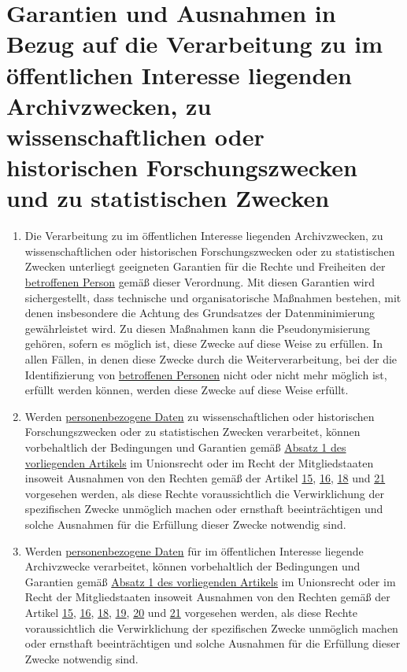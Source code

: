 \chapter{Garantien und Ausnahmen in Bezug auf die Verarbeitung zu im öffentlichen Interesse liegenden Archivzwecken, zu
 wissenschaftlichen oder historischen Forschungszwecken und zu statistischen Zwecken}
\label{ch:89}


\begin{enumerate}

  \item Die Verarbeitung zu im öffentlichen Interesse liegenden Archivzwecken, zu wissenschaftlichen oder historischen
   Forschungszwecken oder zu statistischen Zwecken unterliegt geeigneten Garantien für die Rechte und Freiheiten der
   \hyperref[itm:04-1]{betroffenen Person} gemäß dieser Verordnung. Mit diesen Garantien wird sichergestellt, dass technische und
   organisatorische Maßnahmen bestehen, mit denen insbesondere die Achtung des Grundsatzes der Datenminimierung
   gewährleistet wird. Zu diesen Maßnahmen kann die Pseudonymisierung gehören, sofern es möglich ist, diese Zwecke auf
   diese Weise zu erfüllen. In allen Fällen, in denen diese Zwecke durch die Weiterverarbeitung, bei der die
   Identifizierung von \hyperref[itm:04-1]{betroffenen Personen} nicht oder nicht mehr möglich ist, erfüllt werden können, werden diese
   Zwecke auf diese Weise erfüllt.
  \label{itm:89-1}

  \item Werden \hyperref[itm:04-1]{personenbezogene Daten} zu wissenschaftlichen oder historischen Forschungszwecken oder zu statistischen
   Zwecken verarbeitet, können vorbehaltlich der Bedingungen und Garantien gemäß \hyperref[itm:89-1]{Absatz 1 des
   vorliegenden Artikels} im Unionsrecht oder im Recht der Mitgliedstaaten insoweit Ausnahmen von den Rechten gemäß der
   Artikel \hyperref[ch:15]{15}, \hyperref[ch:16]{16}, \hyperref[ch:18]{18} und \hyperref[ch:21]{21} vorgesehen werden,
   als diese Rechte voraussichtlich die Verwirklichung der spezifischen Zwecke unmöglich machen oder ernsthaft
   beeinträchtigen und solche Ausnahmen für die Erfüllung dieser Zwecke notwendig sind.
  \label{itm:89-2}

  \item Werden \hyperref[itm:04-1]{personenbezogene Daten} für im öffentlichen Interesse liegende Archivzwecke verarbeitet, können
   vorbehaltlich der Bedingungen und Garantien gemäß \hyperref[itm:89-1]{Absatz 1 des vorliegenden Artikels} im
   Unionsrecht oder im Recht der Mitgliedstaaten insoweit Ausnahmen von den Rechten gemäß der Artikel \hyperref[ch:15]
   {15}, \hyperref[ch:16]{16}, \hyperref[ch:18]{18}, \hyperref[ch:19]{19}, \hyperref[ch:20]{20} und \hyperref[ch:21]
   {21} vorgesehen werden, als diese Rechte voraussichtlich die Verwirklichung der spezifischen Zwecke unmöglich machen
   oder ernsthaft beeinträchtigen und solche Ausnahmen für die Erfüllung dieser Zwecke notwendig sind.
  \label{itm:89-3}


\end{enumerate}
